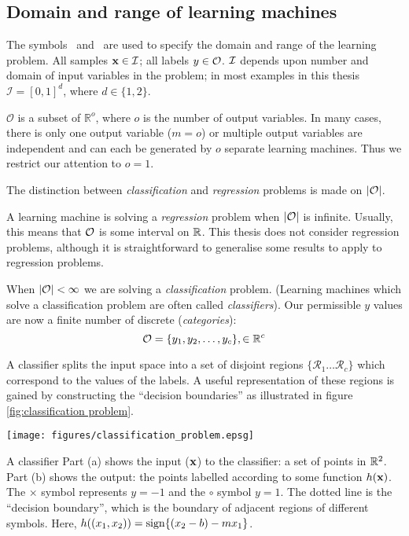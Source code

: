 \subsection{Domain and range of learning machines}
\label{sec:domain and range}

The symbols \calI\ and \calO\ are used to specify the domain and
range of the learning problem.  All samples $\mathbf{x} \in \mathcal{I}$; all
labels $y \in \mathcal{O}$.  $\mathcal{I}$ depends upon number and
domain of input variables in the problem; in most examples in this
thesis $\mathcal{I} = [0,1]^d$, where $d \in \{1, 2 \}$.

$\mathcal{O}$ is a subset of $\mathbb{R}^o$, where $o$ is the number
of output variables.  In many cases, there is only one output
variable ($m=o$) or multiple output variables are independent and
can each be generated by $o$ separate learning machines.
Thus we restrict our attention to $o=1$.

The distinction between \emph{classification} and \emph{regression}
problems is made on $|\mathcal{O}|$.

A learning machine is solving a \emph{regression} problem when
$|\mathcal{O}|$ is infinite.  Usually, this means that $\mathcal{O}$ is some
interval on $\mathbb{R}$.  This thesis does not consider regression
problems, although it is straightforward to generalise some results to
apply to regression problems. 

When $|\mathcal{O}| < \infty$ we are solving a \emph{classification}
problem.  (Learning machines which solve a classification problem are
often called \emph{classifiers}).  Our permissible $y$ values are now
a finite number of discrete (\emph{categories}):
%
\begin{equation}
\mathcal{O} = \{y_1, y_2, \ldots, y_c\}, \in \mathbb{R}^c
\end{equation}

A classifier splits the input space into a set of disjoint regions 
$\{ \mathcal{R}_1 \ldots \mathcal{R}_c \}$ which correspond to the
values of the labels.  A useful representation of these regions is 
gained by constructing the ``decision boundaries'' as illustrated in
figure \ref{fig:classification problem}. 

\begin{linefigure}
\begin{center}
\texttt{[image: figures/classification\_problem.epsg]}
\end{center}
\begin{capt}{A classifier}
Part (a) shows the input ($\mathbf{x}$) to the classifier: a set of
points in $\mathbb{R}^2$.  Part (b) shows the output: the points labelled
according to some function $h(\mathbf{x})$.  The $\times$ symbol
represents $y=-1$ and the $\circ$ symbol $y=1$.  The dotted line is
the ``decision boundary'', which is the boundary of adjacent regions
of different symbols.  Here, $h((x_1, x_2)) = \mathrm{sign}\{ (x_2 - b) - m
x_1 \}$.
\end{capt}
\label{fig:classification problem}
\end{linefigure}

